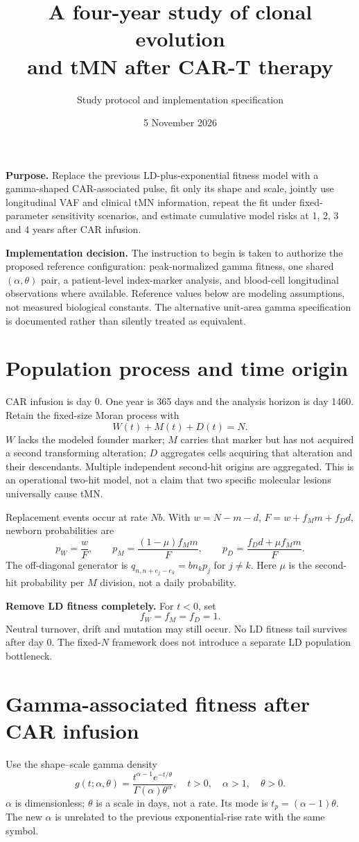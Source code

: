 \documentclass[11pt]{article}
\title{\color{navy}A four-year study of clonal evolution\texorpdfstring{\\}{ }and tMN after CAR-T therapy}
\author{Study protocol and implementation specification}
\date{5 November 2026}
\begin{document}
\maketitle
\textbf{Purpose.} Replace the previous LD-plus-exponential fitness model with a gamma-shaped CAR-associated pulse, fit only its shape and scale, jointly use longitudinal VAF and clinical tMN information, repeat the fit under fixed-parameter sensitivity scenarios, and estimate cumulative model risks at 1, 2, 3 and 4 years after CAR infusion.

\textbf{Implementation decision.} The instruction to begin is taken to authorize the proposed reference configuration: peak-normalized gamma fitness, one shared $(\alpha,\theta)$ pair, a patient-level index-marker analysis, and blood-cell longitudinal observations where available. Reference values below are modeling assumptions, not measured biological constants. The alternative unit-area gamma specification is documented rather than silently treated as equivalent.

\section{Population process and time origin}
CAR infusion is day 0. One year is 365 days and the analysis horizon is day 1460. Retain the fixed-size Moran process with
\[
W(t)+M(t)+D(t)=N.
\]
$W$ lacks the modeled founder marker; $M$ carries that marker but has not acquired a second transforming alteration; $D$ aggregates cells acquiring that alteration and their descendants. Multiple independent second-hit origins are aggregated. This is an operational two-hit model, not a claim that two specific molecular lesions universally cause tMN.

Replacement events occur at rate $Nb$. With $w=N-m-d$, $F=w+f_Mm+f_Dd$, newborn probabilities are
\[
p_W=\frac wF,\qquad p_M=\frac{(1-\mu)f_Mm}{F},\qquad
p_D=\frac{f_Dd+\mu f_Mm}{F}.
\]
The off-diagonal generator is $q_{n,n+e_j-e_k}=b n_kp_j$ for $j\ne k$. Here $\mu$ is the second-hit probability per $M$ division, not a daily probability.

\textbf{Remove LD fitness completely.} For $t<0$, set
\[
f_W=f_M=f_D=1.
\]
Neutral turnover, drift and mutation may still occur. No LD fitness tail survives after day 0. The fixed-$N$ framework does not introduce a separate LD population bottleneck.

\section{Gamma-associated fitness after CAR infusion}
Use the shape--scale gamma density
\[
g(t;\alpha,\theta)=\frac{t^{\alpha-1}e^{-t/\theta}}
{\Gamma(\alpha)\theta^\alpha},\quad t>0,\quad\alpha>1,\quad\theta>0.
\]
$\alpha$ is dimensionless; $\theta$ is a scale in days, not a rate. Its mode is $t_p=(\alpha-1)\theta$. The new $\alpha$ is unrelated to the previous exponential-rise rate with the same symbol.
\end{document}
